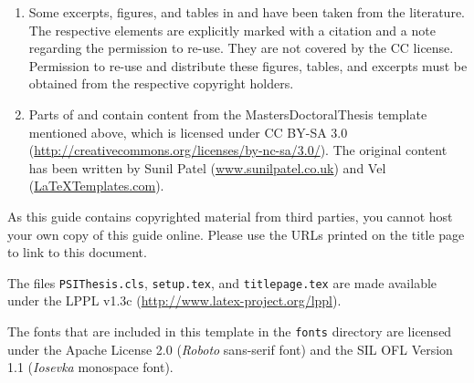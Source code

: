 \begin{enumerate}
\item Some excerpts, figures, and tables in  and  have been taken from the
literature. The respective elements are explicitly marked with a citation and a note
regarding the permission to re-use. They are not
covered by the CC license. Permission to re-use and distribute
these figures, tables, and excerpts must be obtained from the
respective copyright holders.

\item Parts of  and  contain content from the
MastersDoctoralThesis template mentioned above, which is licensed under 
CC BY-SA 3.0 (\url{http://creativecommons.org/licenses/by-nc-sa/3.0/}). 
The original content has been written by
Sunil Patel (\href{http://www.sunilpatel.co.uk}{www.sunilpatel.co.uk}) and
Vel (\href{http://www.LaTeXTemplates.com}{LaTeXTemplates.com}).
\end{enumerate}

As this guide contains copyrighted material from third parties, you cannot host your own copy of this guide online. Please use the URLs printed on the title page to link to this document.

The files \texttt{PSIThesis.cls}, \texttt{setup.tex}, and \texttt{titlepage.tex} are made available under
the LPPL v1.3c (\url{http://www.latex-project.org/lppl}).

The fonts that are included in this template in the \texttt{fonts} directory are licensed under the Apache License 2.0 (\emph{Roboto} sans-serif font) and the SIL OFL Version 1.1 (\emph{Iosevka} monospace font).
